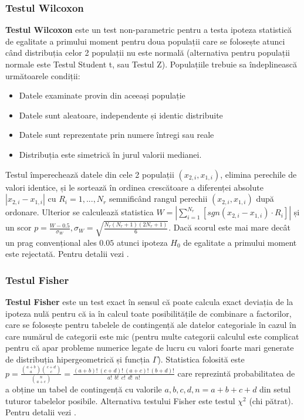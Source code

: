 \documentclass[12pt,draft]{article}
\begin{document}
\subsubsection{Testul Wilcoxon}
 \textbf{Testul Wilcoxon} este un test non-parametric pentru a testa ipoteza statistică de egalitate a primului moment pentru doua populații care se folosește atunci când distribuția celor 2 populații nu este normală (alternativa pentru populații normale este Testul Student t, sau Testul Z). 
 Populațiile trebuie sa îndeplinească următoarele condiții:
 \begin{itemize}
  \item Datele examinate provin din aceeași populație
  \item Datele sunt aleatoare, independente și identic distribuite
  \item Datele sunt reprezentate prin numere întregi sau reale
  \item Distribuția este simetrică în jurul valorii medianei.
 \end{itemize}
  Testul împerechează datele din cele 2 populații $(x_{2,i},x_{1,i})$, elimina perechile de valori identice, și le sortează în ordinea crescătoare a diferenței absolute $|x_{2,i}-x_{1,i}|$ cu $R_i=1, ..., N_r$ semnificând rangul perechii $(x_{2,i},x_{1,i})$ după ordonare. 
  Ulterior se calculează statistica $W = |\sum_{i=1}^{N_r} [sgn(x_{2,i} - x_{1,i}) \cdot R_i]| $ și un scor $p = \frac{W - 0.5}{\sigma_W}, \sigma_W = \sqrt{\frac{N_r(N_r + 1)(2N_r + 1)}{6}}$. 
  Dacă scorul este mai mare decât un prag convențional ales $0.05$ atunci ipoteza $H_0$ de egalitate a primului moment este rejectată. 
  Pentru detalii vezi \citep{wilcoxon45,siegel56}.

\subsubsection{Testul Fisher}
 \label{testFisher}
 \textbf{Testul Fisher} este un test exact în sensul că poate calcula exact deviația de la ipoteza nulă pentru că ia în calcul toate posibilitățile de combinare a factorilor, care se folosește pentru tabelele de contingență ale datelor categoriale în cazul în care numărul de categorii este mic (pentru multe categorii calculul este complicat pentru că apar probleme numerice legate de lucru cu valori foarte mari generate de distribuția hipergeometrică și funcția $\Gamma$). Statistica folosită este $p = \frac{ \displaystyle{{a+b}\choose{a}} \displaystyle{{c+d}\choose{c}} }{ \displaystyle{{n}\choose{a+c}} } = \frac{(a+b)!~(c+d)!~(a+c)!~(b+d)!}{a!~~b!~~c!~~d!~~n!}$ care reprezintă probabilitatea de a obține un tabel de contingență cu valorile $a, b, c, d, n=a+b+c+d$ din setul tuturor tabelelor posibile. Alternativa testului Fisher este testul $\chi^2$ (chi pătrat). Pentru detalii vezi \citep{fisher1922interpretation}.
\end{document}
